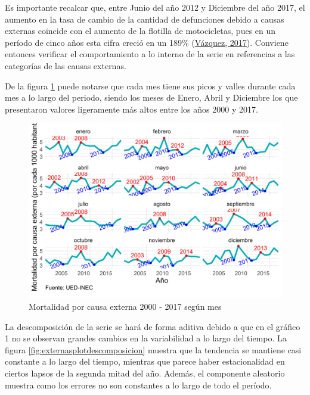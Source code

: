 \documentclass[
]{article}
\begin{document}
Es importante recalcar que, entre Junio del año 2012 y Diciembre del año
2017, el aumento en la tasa de cambio de la cantidad de defunciones
debido a causas externas coincide con el aumento de la flotilla de
motocicletas, pues en un período de cinco años esta cifra creció en un
189\% (\protect\hyperlink{ref-motos}{Vázquez, 2017}). Conviene entonces
verificar el comportamiento a lo interno de la serie en referencias a
las categorías de las causas externas.

De la figura \ref{fig:externasplotperiodos} puede notarse que cada mes
tiene sus picos y valles durante cada mes a lo largo del periodo, siendo
los meses de Enero, Abril y Diciembre los que presentaron valores
ligeramente más altos entre los años 2000 y 2017.

\begin{figure}[!h]
\includegraphics[width=1\linewidth,height=1\textheight]{Tesis_files/figure-latex/externasplotperiodos-1} \caption{Mortalidad por causa externa 2000 - 2017 según mes}\label{fig:externasplotperiodos}
\end{figure}

La descomposición de la serie se hará de forma aditiva debido a que en
el gráfico 1 no se observan grandes cambios en la variabilidad a lo
largo del tiempo. La figura \ref{fig:externasplotdescomposicion} muestra
que la tendencia se mantiene casi constante a lo largo del tiempo,
mientras que parece haber estacionalidad en ciertos lapsos de la segunda
mitad del año. Además, el componente aleatorio muestra como los errores
no son constantes a lo largo de todo el período.
\end{document}
